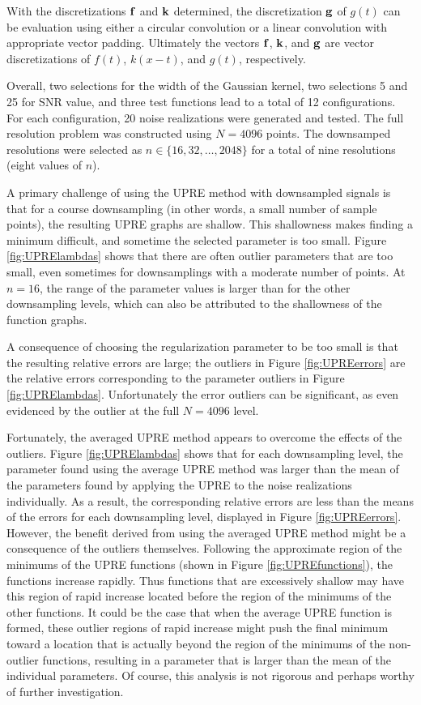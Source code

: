 With the discretizations $\mathbf{f}$ and $\mathbf{k}$ determined, the discretization $\mathbf{g}$ of $g(t)$ can be evaluation using either a circular convolution or a linear convolution with appropriate vector padding. Ultimately the vectors $\mathbf{f}$, $\mathbf{k}$, and $\mathbf{g}$ are vector discretizations of $f(t)$, $k(x-t)$, and $g(t)$, respectively. \par
Overall, two selections for the width of the Gaussian kernel, two selections 5 and 25 for SNR value, and three test functions lead to a total of 12 configurations. For each configuration, 20 noise realizations were generated and tested. The full resolution problem was constructed using $N = 4096$ points. The downsamped resolutions were selected as $n \in \{16,32,\ldots,2048\}$ for a total of nine resolutions (eight values of $n$). \par 
A primary challenge of using the UPRE method with downsampled signals is that for a course downsampling (in other words, a small number of sample points), the resulting UPRE graphs are shallow. This shallowness makes finding a minimum difficult, and sometime the selected parameter is too small. Figure \ref{fig:UPRElambdas} shows that there are often outlier parameters that are too small, even sometimes for downsamplings with a moderate number of points. At $n = 16$, the range of the parameter values is larger than for the other downsampling levels, which can also be attributed to the shallowness of the function graphs. \par 
A consequence of choosing the regularization parameter to be too small is that the resulting relative errors are large; the outliers in Figure \ref{fig:UPREerrors} are the relative errors corresponding to the parameter outliers in Figure \ref{fig:UPRElambdas}. Unfortunately the error outliers can be significant, as even evidenced by the outlier at the full $N = 4096$ level. \par 
Fortunately, the averaged UPRE method appears to overcome the effects of the outliers. Figure \ref{fig:UPRElambdas} shows that for each downsampling level, the parameter found using the average UPRE method was larger than the mean of the parameters found by applying the UPRE to the noise realizations individually. As a result, the corresponding relative errors are less than the means of the errors for each downsampling level, displayed in Figure \ref{fig:UPREerrors}. However, the benefit derived from using the averaged UPRE method might be a consequence of the outliers themselves. Following the approximate region of the minimums of the UPRE functions (shown in Figure \ref{fig:UPREfunctions}), the functions increase rapidly. Thus functions that are excessively shallow may have this region of rapid increase located before the region of the minimums of the other functions. It could be the case that when the average UPRE function is formed, these outlier regions of rapid increase might push the final minimum toward a location that is actually beyond the region of the minimums of the non-outlier functions, resulting in a parameter that is larger than the mean of the individual parameters. Of course, this analysis is not rigorous and perhaps worthy of further investigation. 

